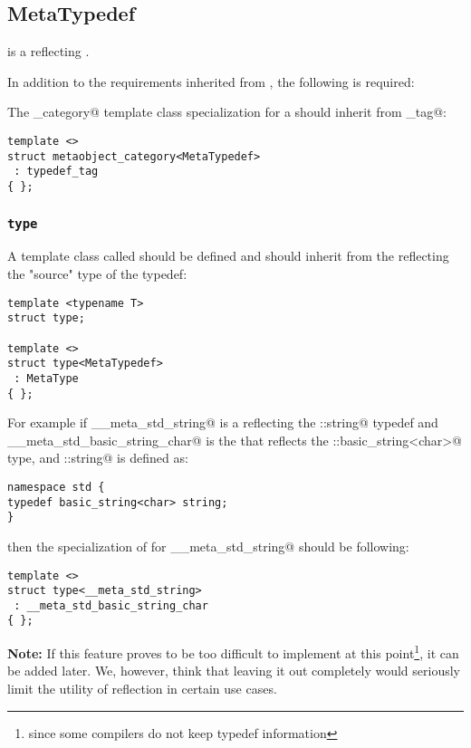 \subsection{MetaTypedef}
\label{concept-MetaTypedef}

 is a  reflecting \verb@typedef@s.

In addition to the requirements inherited from , the following is required:

The \verb@metaobject_category@ template class specialization for a  should
inherit from \verb@typedef_tag@:

\begin{verbatim}
template <>
struct metaobject_category<MetaTypedef>
 : typedef_tag
{ };
\end{verbatim}

\subsubsection{\texttt{type}}

A template class called \verb@type@ should be defined and should inherit from the 
reflecting the "source" type of the typedef:

\begin{verbatim}
template <typename T>
struct type;

template <>
struct type<MetaTypedef>
 : MetaType
{ };
\end{verbatim}

For example if \verb@__meta_std_string@ is a  reflecting the \verb@std::string@
typedef and \verb@__meta_std_basic_string_char@ is the  that reflects
the \verb@std::basic_string<char>@ type, and \verb@std::string@ is defined as:

\begin{verbatim}
namespace std {
typedef basic_string<char> string;
}
\end{verbatim}

then the specialization of \verb@type@ for \verb@__meta_std_string@ should be following:

\begin{verbatim}
template <>
struct type<__meta_std_string>
 : __meta_std_basic_string_char
{ };
\end{verbatim}

\textbf{Note:} If this feature proves to be too difficult to implement 
at this point\footnote{since some compilers do not keep typedef information},
it can be added later. We, however, think that leaving it out completely would
seriously limit the utility of reflection in certain use cases.
